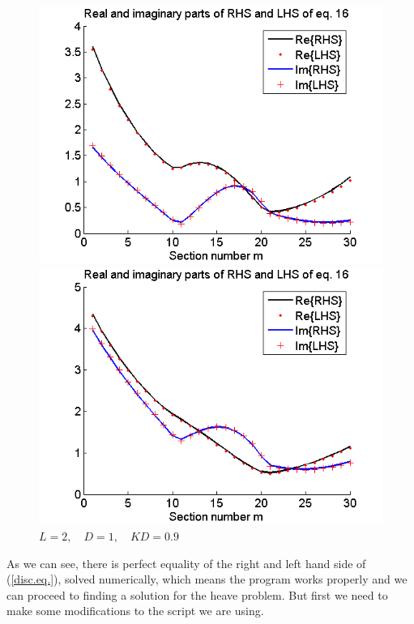 \documentclass[a4paper,10pt]{article}
\begin{document}
\begin{figure}[H]
  \includegraphics[width=\linewidth]{L2_KD=12.png}
  \caption{$L = 2 , \quad D = 1 , \quad K D = 1.2$}\label{L2_KD1.2}
\endminipage\hfill
{}
  \includegraphics[width=\linewidth]{L2_KD=09.png}
  \caption{$L = 2 , \quad D = 1 , \quad K D = 0.9$}\label{L2_KD0.9}
\endminipage
\end{figure}

As we can see, there is perfect equality of the right and left hand side of (\ref{disc.eq.}), solved numerically, which means the program works properly and we can proceed to finding a solution for the heave problem. But first we need to make some modifications to the script we are using.\\[1 em]
\end{document}
